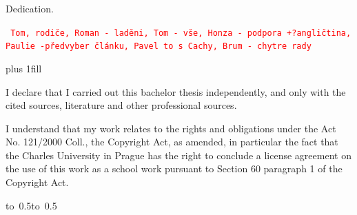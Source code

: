 \documentclass[12pt,a4paper,twoside,openright]{report}
\let\openright=\cleardoublepage
\def\TODO#1{
\texttt{\textcolor{red}{#1}}
}
\begin{document}
\newpage



\openright

\noindent
Dedication.
\TODO{ Tom, rodiče, Roman - laděni, Tom - vše, Honza - podpora +?angličtina, 
Paulie -předvyber článku, Pavel to s Cachy, Brum - chytre rady}

\newpage


\vglue 0pt plus 1fill

\noindent
I declare that I carried out this bachelor thesis independently, and only with the cited
sources, literature and other professional sources.

\medskip\noindent
I understand that my work relates to the rights and obligations under the Act No.
121/2000 Coll., the Copyright Act, as amended, in particular the fact that the Charles
University in Prague has the right to conclude a license agreement on the use of this
work as a school work pursuant to Section 60 paragraph 1 of the Copyright Act.

\vspace{10mm}

\hbox{\hbox to 0.5\hbox to 0.5}

\vspace{20mm}
\newpage

\end{document}
